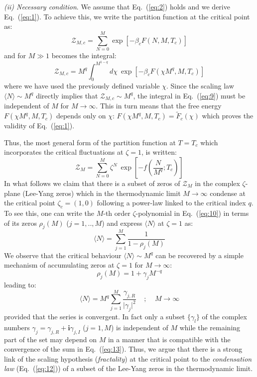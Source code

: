 \documentclass[aps,pre,showpacs,amsmath,amssymb,superscriptaddress,twocolumn]{revtex4-1}
\begin{document}
\noindent
{\em (ii) Necessary condition}. We assume that Eq.~(\ref{eq:2}) holds and we derive Eq.~(\ref{eq:1}). To achieve this, we write the partition function at the critical point as:
\begin{equation}
\mathcal{Z}_{M,c}={\displaystyle{\sum_{N=0}^M}} {\displaystyle{\exp[-\beta_c F(N,M,T_c)]}}
\label{eq:8}
\end{equation}
and for $M \gg 1$ becomes the integral:
\begin{equation}
\mathcal{Z}_{M,c}=M^q {\displaystyle{\int_0^{M^{1-q}}}} d\chi ~ \exp[-\beta_c {\displaystyle{F(\chi M^q,M,T_c)}}]
\label{eq:9}
\end{equation}
where we have used the previously defined variable $\chi$. Since the scaling law $\langle N \rangle \sim M^q$ directly implies that $\mathcal{Z}_{M,c} \sim M^q$, the integral in Eq.~(\ref{eq:9}) must be independent of $M$ for $M \to \infty$. This in turn means that the free energy $F(\chi M^q,M,T_c)$ depends only on $\chi$:
$F(\chi M^q,M,T_c)=\tilde{F}_c(\chi)$ which proves the validity of Eq.~(\ref{eq:1}). 

Thus, the most general form of the partition function at $T=T_c$ which incorporates the critical fluctuations at $\zeta=1$, is written:
\begin{equation}
\mathcal{Z}_M={\displaystyle{\sum_{N=0}^M}} \zeta^N~ {\displaystyle{\exp[-{\displaystyle{f}}({\displaystyle{\frac{N}{M^q};T_c}})]}}
\label{eq:10}
\end{equation}
In what follows we claim that there is a subset of zeros of $\mathcal{Z}_M$ in the complex $\zeta$-plane (Lee-Yang zeros) which in the thermodynamic limit $M \to \infty$ condense at the critical point $\zeta_c=(1,0)$ following a power-law linked to the critical index $q$. To see this, one can write the $M$-th order $\zeta$-polynomial in Eq.~(\ref{eq:10}) in terms of its zeros $\rho_j(M)$ ($j=1,..,M$) and express $\langle N \rangle$ at $\zeta=1$ as:
\begin{equation}
\langle N \rangle = {\displaystyle{\sum_{j=1}^M}} \frac{1}{1-\rho_j(M)} 
\label{eq:11}
\end{equation}
We observe that the critical behaviour $\langle N \rangle \sim M^q$ can be recovered by a simple mechanism of accumulating zeros at $\zeta=1$ for $M \to \infty$:
\begin{equation}
\rho_j(M)=1+\gamma_j M^{-q}
\label{eq:12}
\end{equation}
leading to:
\begin{equation}
\langle N \rangle = M^q {\displaystyle{\sum_{j=1}^M}} \frac{\gamma_{j,R}}{\vert \gamma_j \vert^2}~~~~~;~~~~~M \to \infty
\label{eq:13}
\end{equation}
provided that the series is convergent. In fact only a subset $\{\gamma_l\}$ of the complex numbers $\gamma_j=\gamma_{j,R} + \mathbf{i} \gamma_{j,I}$ ($j=1,M$) is independent of $M$ while the remaining part of the set may depend on $M$ in a manner that is compatible with the convergence of the sum in Eq.~(\ref{eq:13}). Thus, we argue that there is a strong link of the scaling hypothesis ({\em fractality}) at the critical point to the {\em condensation law} (Eq.~(\ref{eq:12})) of a subset of the Lee-Yang zeros in the thermodynamic limit.  
\end{document}
